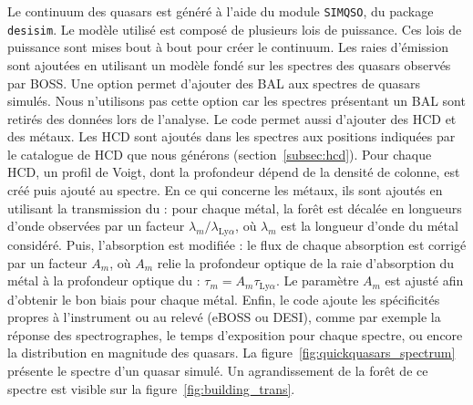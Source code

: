 Le continuum des quasars est généré à l'aide du module \texttt{SIMQSO}, du package \texttt{desisim}.
Le modèle utilisé est composé de plusieurs lois de puissance. Ces lois de puissance sont mises bout à bout pour créer le continuum.
Les raies d'émission sont ajoutées en utilisant un modèle fondé sur les spectres des quasars observés par BOSS.
Une option permet d'ajouter des BAL aux spectres de quasars simulés. Nous n'utilisons pas cette option car les spectres présentant un BAL sont retirés des données lors de l'analyse.
Le code permet aussi d'ajouter des HCD et des métaux. Les HCD sont ajoutés dans les spectres aux positions indiquées par le catalogue de HCD que nous générons (section~\ref{subsec:hcd}). Pour chaque HCD, un profil de Voigt, dont la profondeur dépend de la densité de colonne, est créé puis ajouté au spectre.
En ce qui concerne les métaux, ils sont ajoutés en utilisant la transmission du \lya{} : pour chaque métal, la forêt \lya{} est décalée en longueurs d'onde observées par un facteur $\lambda_m / \lambda_{\mathrm{Ly}\alpha}$, où $\lambda_m$ est la longueur d'onde du métal considéré.
Puis, l'absorption est modifiée : 
le flux de chaque absorption est corrigé par un facteur $A_m$, où $A_m$ relie la profondeur optique de la raie d'absorption du métal à la profondeur optique du \lya{} : $\tau_m = A_m \tau_{\mathrm{Ly}\alpha}$. Le paramètre $A_m$ est ajusté afin d'obtenir le bon biais pour chaque métal.
Enfin, le code ajoute les spécificités propres à l'instrument ou au relevé (eBOSS ou DESI), comme par exemple la réponse des spectrographes, le temps d'exposition pour chaque spectre, ou encore la distribution en magnitude des quasars.
La figure~\ref{fig:quickquasars_spectrum} présente le spectre d'un quasar simulé. Un agrandissement de la forêt \lya{} de ce spectre est visible sur la figure~\ref{fig:building_trans}.

